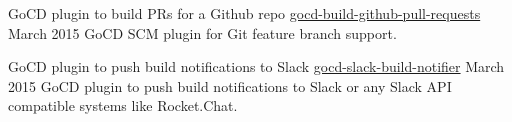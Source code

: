 \begin{cventries}
  \cventry
    {GoCD plugin to build PRs for a Github repo} %
    {\href{https://github.com/ashwanthkumar/gocd-build-github-pull-requests}{gocd-build-github-pull-requests}} %
    {March 2015} %
    {} %
    {
    GoCD SCM plugin for Git feature branch support.
    }

  \cventry
    {GoCD plugin to push build notifications to Slack} %
    {\href{https://github.com/ashwanthkumar/gocd-slack-build-notifier}{gocd-slack-build-notifier}} %
    {March 2015} %
    {} %
    {
    GoCD plugin to push build notifications to Slack or any Slack API compatible systems like Rocket.Chat.
    }

\end{cventries}

